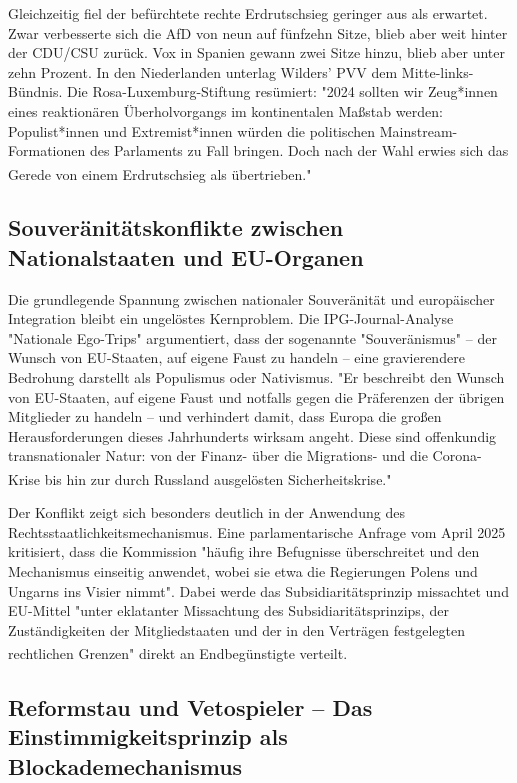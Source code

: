 \documentclass[12pt,a4paper]{article}
\newcommand{\footcite}[1]{\textsuperscript{\cite{#1}}}
\begin{document}
	Gleichzeitig fiel der befürchtete rechte Erdrutschsieg geringer aus als erwartet. Zwar verbesserte sich die AfD von neun auf fünfzehn Sitze, blieb aber weit hinter der CDU/CSU zurück. Vox in Spanien gewann zwei Sitze hinzu, blieb aber unter zehn Prozent. In den Niederlanden unterlag Wilders' PVV dem Mitte-links-Bündnis. Die Rosa-Luxemburg-Stiftung resümiert: "2024 sollten wir Zeug*innen eines reaktionären Überholvorgangs im kontinentalen Maßstab werden: Populist*innen und Extremist*innen würden die politischen Mainstream-Formationen des Parlaments zu Fall bringen. Doch nach der Wahl erwies sich das Gerede von einem Erdrutschsieg als übertrieben."\footcite{RosaLux2024}
	
	\subsection{Souveränitätskonflikte zwischen Nationalstaaten und EU-Organen}
	
	Die grundlegende Spannung zwischen nationaler Souveränität und europäischer Integration bleibt ein ungelöstes Kernproblem. Die IPG-Journal-Analyse "Nationale Ego-Trips" argumentiert, dass der sogenannte "Souveränismus" – der Wunsch von EU-Staaten, auf eigene Faust zu handeln – eine gravierendere Bedrohung darstellt als Populismus oder Nativismus. "Er beschreibt den Wunsch von EU-Staaten, auf eigene Faust und notfalls gegen die Präferenzen der übrigen Mitglieder zu handeln – und verhindert damit, dass Europa die großen Herausforderungen dieses Jahrhunderts wirksam angeht. Diese sind offenkundig transnationaler Natur: von der Finanz- über die Migrations- und die Corona-Krise bis hin zur durch Russland ausgelösten Sicherheitskrise."\footcite{IPG2025}
	
	Der Konflikt zeigt sich besonders deutlich in der Anwendung des Rechtsstaatlichkeitsmechanismus. Eine parlamentarische Anfrage vom April 2025 kritisiert, dass die Kommission "häufig ihre Befugnisse überschreitet und den Mechanismus einseitig anwendet, wobei sie etwa die Regierungen Polens und Ungarns ins Visier nimmt". Dabei werde das Subsidiaritätsprinzip missachtet und EU-Mittel "unter eklatanter Missachtung des Subsidiaritätsprinzips, der Zuständigkeiten der Mitgliedstaaten und der in den Verträgen festgelegten rechtlichen Grenzen" direkt an Endbegünstigte verteilt.\footcite{Furet2025}
	
	\subsection{Reformstau und Vetospieler – Das Einstimmigkeitsprinzip als Blockademechanismus}
	
\end{document}
